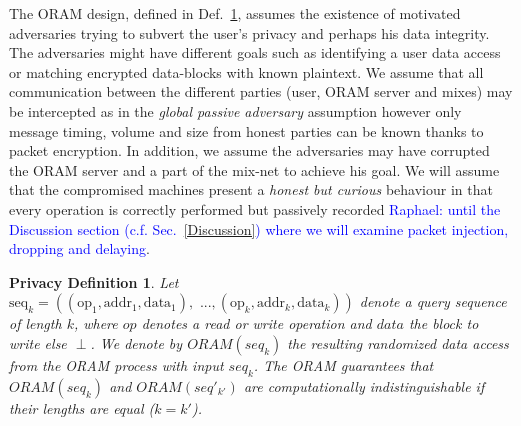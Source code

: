 \documentclass{llncs}
\newtheorem{privdef}{Privacy Definition}
\newcommand{\raphael}[1]{\textcolor{blue}{Raphael: #1}}
\begin{document}
The ORAM design, defined in Def.~\ref{def:Oram}, assumes the existence of motivated adversaries trying to subvert the user's privacy and perhaps his data integrity.
The adversaries might have different goals such as identifying a user data access or matching encrypted data-blocks with known plaintext. 
\noindent We assume that all communication between the different parties (user, ORAM server and mixes) may be intercepted as in the \textit{global passive adversary} assumption however only message timing, volume and size from honest parties can be known thanks to packet encryption.
In addition, we assume the adversaries may have corrupted the ORAM server and a part of the mix-net to achieve his goal.
We will assume that the compromised machines present a \textit{honest but curious} behaviour in that every operation is correctly performed but passively recorded \raphael{until the Discussion section (c.f. Sec.~\ref{Discussion}) where we will examine packet injection, dropping and delaying}.

\begin{privdef}\label{def:Oram}
Let $\text{seq}_k=((\text{op}_1, \text{addr}_1, \text{data}_1), \text{ ...},(\text{op}_k, \text{addr}_k, \text{data}_k))$ denote a query sequence of length $k$, where $op$ denotes a read or write operation and $data$ the block to write else $
\perp$.
We denote by $ORAM(seq_k)$ the resulting randomized data access from the ORAM process with input $seq_k$.
The ORAM guarantees that $ORAM(seq_k)$ and $ORAM(seq'_{k'})$ are computationally indistinguishable if their lengths are equal ($k=k'$).
\end{privdef}
\end{document}
